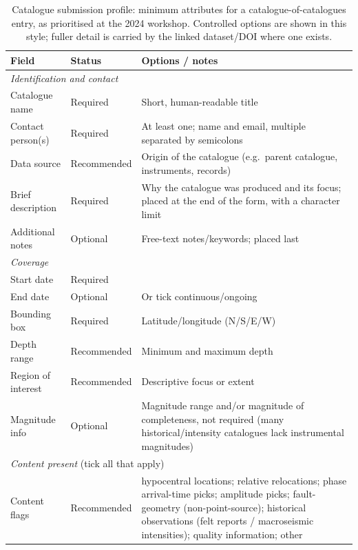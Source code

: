 \documentclass[11pt]{article}
\begin{document}
\begin{table}[H]
\centering
\small
\caption{Catalogue submission profile: minimum attributes for a catalogue-of-catalogues entry, as prioritised at the 2024 workshop. Controlled options are shown \textsf{in this style}; fuller detail is carried by the linked dataset/DOI where one exists.}
\label{tab:profile}
\setlength{\tabcolsep}{5pt}
\renewcommand{\arraystretch}{1.15}
\begin{tabular}{p{3.4cm} p{2.2cm} p{7.4cm}}
\toprule
\textbf{Field} & \textbf{Status} & \textbf{Options / notes} \\
\midrule
\multicolumn{3}{l}{\textit{Identification and contact}} \\
\midrule
Catalogue name      & Required    & Short, human-readable title \\
Contact person(s)   & Required    & At least one; name and email, multiple separated by semicolons \\
Data source         & Recommended & Origin of the catalogue (e.g.\ parent catalogue, instruments, records) \\
Brief description   & Required    & Why the catalogue was produced and its focus; placed at the end of the form, with a character limit \\
Additional notes    & Optional    & Free-text notes/keywords; placed last \\
\midrule
\multicolumn{3}{l}{\textit{Coverage}} \\
\midrule
Start date          & Required    & \\
End date            & Optional    & Or tick \textsf{continuous/ongoing} \\
Bounding box        & Required    & Latitude/longitude (N/S/E/W) \\
Depth range         & Recommended & Minimum and maximum depth \\
Region of interest  & Recommended & Descriptive focus or extent \\
Magnitude info      & Optional    & Magnitude range and/or magnitude of completeness, not required (many historical/intensity catalogues lack instrumental magnitudes) \\
\midrule
\multicolumn{3}{l}{\textit{Content present} (tick all that apply)} \\
\midrule
Content flags       & Recommended & \textsf{hypocentral locations}; \textsf{relative relocations}; \textsf{phase arrival-time picks}; \textsf{amplitude picks}; \textsf{fault-geometry (non-point-source)}; \textsf{historical observations} (felt reports / macroseismic intensities); \textsf{quality information}; \textsf{other} \\

\end{tabular}
\end{table}
\end{document}
